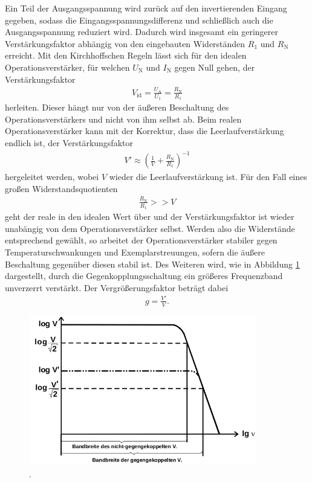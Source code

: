 Ein Teil der Ausgangsspannung wird zurück auf den invertierenden Eingang gegeben, sodass die Eingangsspannungsdifferenz
und schließlich auch die Ausgangsspannung reduziert wird. Dadurch wird insgesamt ein geringerer Verstärkungsfaktor abhängig von
den eingebauten Widerständen $R_1$ und $R_\text{N}$ erreicht. Mit den Kirchhoffschen Regeln lässt sich für den idealen
Operationsverstärker, für welchen $U_\text{N}$ und $I_\text{N}$ gegen Null gehen, der Verstärkungsfaktor
\begin{align}
  V_\text{id} = \frac{U_\text{A}}{U_\text{1}} = \frac{R_\text{N}}{R_1}
\end{align}
herleiten. Dieser hängt nur von der äußeren Beschaltung des Operationsverstärkers und nicht von ihm selbst ab.
Beim realen Operationsverstärker kann mit der Korrektur, dass die Leerlaufverstärkung endlich ist, der
Verstärkungsfaktor
\begin{align}
  V' \approx \left( \frac1{V} + \frac{R_\text{N}}{R_1} \right)^{-1}
  \label{eqn:leerlaufverst}
\end{align}
hergeleitet werden, wobei $V$ wieder die Leerlaufverstärkung ist. Für den Fall eines großen Widerstandsquotienten
\begin{align}
  \frac{R_\text{N}}{R_1} >> V
\end{align}
geht der reale in den idealen Wert über und der Verstärkungsfaktor ist wieder unabängig von dem Operationsverstärker selbst.
Werden also die Widerstände entsprechend gewählt, so arbeitet der Operationsverstärker stabiler gegen Temperaturschwankungen
und Exemplarstreuungen, sofern die äußere Beschaltung gegenüber diesen stabil ist.
Des Weiteren wird, wie in Abbildung \ref{fig:frequenzband} dargestellt, durch die Gegenkopplungsschaltung ein größeres Frequenzband unverzerrt verstärkt.
Der Vergrößerungsfaktor beträgt dabei
\begin{align}
  g = \frac{V'}{V}.
\end{align}

\begin{figure}
  \centering
  \includegraphics[height=6.5cm]{ImmerDieseNorweger/frequenzband.png}
  \caption{\cite{anleitung}.}
  \label{fig:frequenzband}
\end{figure}

